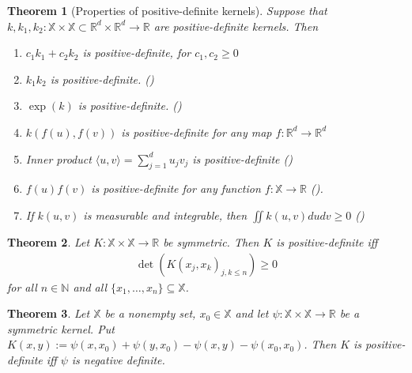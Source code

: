 \documentclass[]{elsarticle}
\newcommand{\inp}[1]{\langle{#1}\rangle}
\newtheorem{theorem}{Theorem}
\newenvironment{proof}[1][Proof]{\noindent\textbf{#1.} }{\ \rule{0.5em}{0.5em}}
\numberwithin{equation}{section}
\numberwithin{theorem}{section}
\newcommand\RR{{\mathbb R}}
\newcommand\NN{{\mathbb N}}
\begin{document}
 \begin{theorem}[Properties of positive-definite kernels]\label{t52}
 Suppose that $k, k_1, k_2: \mathbb{X}\times\mathbb{X}\subset\mathbb{R}^d\times\mathbb{R}^d\to \mathbb{R}$ are positive-definite kernels. Then
\begin{enumerate} \setlength\itemsep{0mm} 
\item $c_1k_1+c_2k_2$ is positive-definite, for $c_1,c_2\ge0$

\item $k_1k_2$ is positive-definite. (\cite[p.69]{BCR84})

\item $\exp(k)$ is positive-definite. (\cite[p.70]{BCR84})

\item $k(f(u),f(v))$ is positive-definite for any  map $f:\mathbb{R}^d\to \mathbb{R}^d$

\item Inner product $\inp{u,v}=\sum_{j=1}^du_jv_j$ is positive-definite (\cite[p.73]{BCR84})

\item $f(u)f(v)$ is positive-definite for any function $f:\mathbb{X}\to \mathbb{R}$ (\cite[p.69]{BCR84}).

\item If $k(u,v)$ is measurable and integrable, then $\iint k(u,v)dudv\ge0$ (\cite[p.524]{RKSF})
\end{enumerate}
\end{theorem}

\begin{theorem} \rm{ \cite[Theorem 3.1.17]{BCR84}} \label{pdm}
Let $K: \mathbb{X}\times \mathbb{X}\rightarrow \RR$ be symmetric. Then $K$ is positive-definite iff
\begin{align*}
\det( K(x_j,x_k)_{j,k\leq n})\geq 0
\end{align*}
for all $n\in \NN$ and all $\{x_1,\ldots,x_n\}\subseteq \mathbb{X}$.
\end{theorem}

\begin{theorem}\rm{ \cite[Lemma 3.2.1]{BCR84} } \label{tpn}
Let $\mathbb{X}$ be a nonempty set, $x_0\in \mathbb{X}$ and let $\psi: \mathbb{X}\times \mathbb{X}\rightarrow \RR$ be a symmetric kernel. Put $ K(x,y):=\psi(x,x_0)+\psi(y,x_0)-\psi(x,y)-\psi(x_0,x_0)$. Then $K$ is positive-definite iff $\psi$ is negative definite.
\end{theorem}
\end{document}
